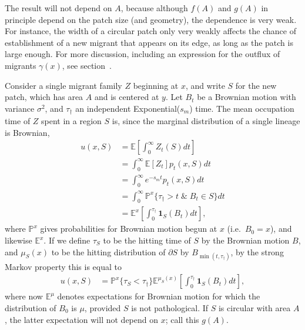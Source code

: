 \documentclass{article}
\renewcommand{\P}{\mathbb{P}}
\newcommand{\E}{\mathbb{E}}
\newcommand{\one}{\mathbf{1}}
\begin{document}
The result will not depend on $A$, 
because although $f(A)$ and $g(A)$ in principle depend on the patch size (and geometry),
the dependence is very weak.
For instance, the width of a circular patch only very weakly affects the chance 
of establishment of a new migrant that appears on its edge,
as long as the patch is large enough.
For more discussion, including an expression for the outflux of migrants $\gamma(x)$, see section~.

Consider a single migrant family $Z$ beginning at $x$,
and write $S$ for the new patch, which has area $A$ and is centered at $y$.
Let $B_t$ be a Brownian motion with variance $\sigma^2$, 
and $\tau_\dagger$ an independent Exponential($s_m$) time.
The mean occupation time of $Z$ spent in a region $S$ is,
since the marginal distribution of a single lineage is Brownian,
\begin{align}
    u(x,S) &= \E\left[\int_0^\infty Z_t(S) dt \right] \\
           &= \int_0^\infty \E[Z_t] p_t(x,S) dt \\
        &= \int_0^\infty e^{-s_m t} p_t(x,S) dt \\
        &= \int_0^\infty \P^x\{ \tau_\dagger > t \; \& \; B_t \in S \} dt \\
        &= \E^x\left[ \int_0^{\tau_\dagger} \one_S(B_t) dt \right]  ,
\end{align}
where $\P^x$ gives probabilities for Brownian motion begun at $x$ (i.e.\ $B_0=x$),
and likewise $\E^x$.
If we define
$\tau_S$ to be the hitting time of $S$ by the Brownian motion $B$,
and $\mu_S(x)$ to be the hitting distribution of $\partial S$ by $B_{\min(t,\tau_\dagger)}$,
by the strong Markov property this is equal to
\begin{align}
    u(x,S) %
           &= \P^x\{ \tau_S < \tau_\dagger \}  \E^{\mu_S(x)}\left[ \int_0^{\tau_\dagger} \one_S(B_t) dt \right] ,
\end{align}
where now $\E^\mu$ denotes expectations for Brownian motion for which the distribution of $B_0$ is $\mu$, 
provided $S$ is not pathological.
If $S$ is circular with area $A$, the latter expectation will not depend on $x$;
call this $g(A)$.
\end{document}
